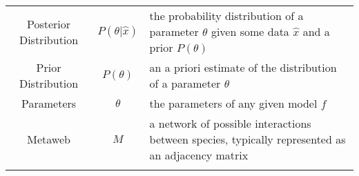 \begin{longtable}[]{@{}ccl@{}}
\begin{minipage}[t]{0.25\columnwidth}
Posterior Distribution\strut
\end{minipage} & \begin{minipage}[t]{0.23\columnwidth}\centering
\(P(\theta | \hat{x})\)\strut
\end{minipage} & \begin{minipage}[t]{0.42\columnwidth}\raggedright
the probability distribution of a parameter \(\theta\) given some data
\(\hat{x}\) and a prior \(P(\theta)\)\strut
\end{minipage}\tabularnewline
\begin{minipage}[t]{0.25\columnwidth}\centering
Prior Distribution\strut
\end{minipage} & \begin{minipage}[t]{0.23\columnwidth}\centering
\(P(\theta)\)\strut
\end{minipage} & \begin{minipage}[t]{0.42\columnwidth}\raggedright
an a priori estimate of the distribution of a parameter \(\theta\)\strut
\end{minipage}\tabularnewline
\begin{minipage}[t]{0.25\columnwidth}\centering
Parameters\strut
\end{minipage} & \begin{minipage}[t]{0.23\columnwidth}\centering
\(\theta\)\strut
\end{minipage} & \begin{minipage}[t]{0.42\columnwidth}\raggedright
the parameters of any given model \(f\)\strut
\end{minipage}\tabularnewline
\begin{minipage}[t]{0.25\columnwidth}\centering
Metaweb\strut
\end{minipage} & \begin{minipage}[t]{0.23\columnwidth}\centering
\(M\)\strut
\end{minipage} & \begin{minipage}[t]{0.42\columnwidth}\raggedright
a network of possible interactions between species, typically
represented as an adjacency matrix\strut
\end{minipage}\tabularnewline
\begin{minipage}[t]{0.25\columnwidth}\centering
\strut
\end{minipage} & \begin{minipage}[t]{0.23\columnwidth}\centering
\strut
\end{minipage} & \begin{minipage}[t]{0.42\columnwidth}\raggedright

\end{minipage}
\end{longtable}

